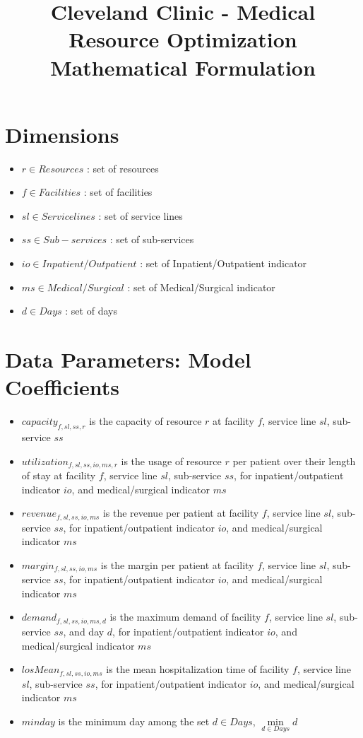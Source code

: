 \documentclass[10pt, letterpaper]{article}
\begin{document}
\title{Cleveland Clinic - Medical Resource Optimization Mathematical Formulation}
\maketitle


\section*{Dimensions}
\begin{itemize}
\item[ ] $ r \in Resources$ : set of resources
\item[ ] $ f \in Facilities$ : set of facilities
\item[ ] $ sl \in Service lines$ : set of service lines
\item[ ] $ ss \in Sub-services$ : set of sub-services
\item[ ] $ io \in Inpatient/Outpatient$ : set of Inpatient/Outpatient indicator
\item[ ] $ ms \in Medical/Surgical$ : set of Medical/Surgical indicator
\item[ ] $ d \in Days$ : set of days
\end{itemize}

\section*{Data Parameters: Model Coefficients}
\begin{itemize}
\item[ ] $capacity_{f,sl,ss,r}$  is the capacity of resource $r$ at facility $f$, service line $sl$, sub-service $ss$
\item[ ] $utilization_{f,sl,ss,io,ms,r}$ is the usage of resource $r$ per patient over their length of stay at facility $f$, service line $sl$, sub-service $ss$, for inpatient/outpatient indicator $io$, and medical/surgical indicator $ms$
\item[ ] $revenue_{f,sl,ss,io,ms}$  is the revenue per patient at facility $f$, service line $sl$, sub-service $ss$, for inpatient/outpatient indicator $io$, and medical/surgical indicator $ms$
\item[ ] $margin_{f,sl,ss,io,ms}$  is the margin per patient at facility $f$, service line $sl$, sub-service $ss$, for inpatient/outpatient indicator $io$, and medical/surgical indicator $ms$
\item[ ] $demand_{f,sl,ss,io,ms,d}$ is the maximum demand of facility $f$, service line $sl$, sub-service $ss$, and day $d$, for inpatient/outpatient indicator $io$, and medical/surgical indicator $ms$
\item[ ] $losMean_{f,sl,ss,io,ms}$  is the mean hospitalization time of facility $f$, service line $sl$, sub-service $ss$, for inpatient/outpatient indicator $io$, and medical/surgical indicator $ms$
\item[ ] $minday$ is the minimum day among the set $ d \in Days$, ${\min\limits_{d \in Days} d}$
\end{itemize}
\end{document}
